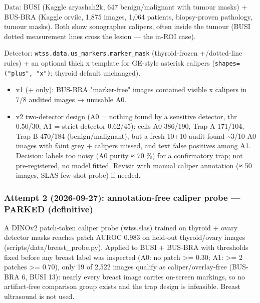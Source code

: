 {\small
Data: BUSI (Kaggle aryashah2k, 647 benign/malignant with tumour masks) + BUS-BRA (Kaggle orvile, 1,875 images,
1,064 patients, biopsy-proven pathology, tumour masks). Both show sonographer calipers, often inside the tumour
(BUSI dotted measurement lines cross the lesion --- the in-ROI case).

Detector: \texttt{wtss.data.us\_markers.marker\_mask} (thyroid-frozen \textquotesingle+\textquotesingle/dotted-line rules) + an optional thick \textquotesingle x\textquotesingle{}
template for GE-style asterisk calipers (\texttt{shapes=("plus",\ "x")}; thyroid default unchanged).

\begin{itemize}

\item
  v1 (\textquotesingle+\textquotesingle{} only): BUS-BRA "marker-free" images contained visible \textquotesingle x\textquotesingle{} calipers in 7/8 audited images → unusable A0.
\item
  v2 two-detector design (A0 = nothing found by a sensitive detector, thr 0.50/30; A1 = strict detector
  0.62/45): cells A0 386/190, Trap A 171/104, Trap B 470/184 (benign/malignant), but a fresh 10+10 audit found
  \textasciitilde3/10 A0 images with faint grey \textquotesingle+\textquotesingle{} calipers missed, and text false positives among A1.
  Decision: labels too noisy (A0 purity ≈ 70 \%) for a confirmatory trap; not pre-registered, no model fitted.
  Revisit with manual caliper annotation (≈ 50 images, SLAS few-shot probe) if needed.
\end{itemize}

\subsubsection{Attempt 2 (2026-09-27): annotation-free caliper probe --- PARKED (definitive)}\label{attempt-2-2026-09-27-annotation-free-caliper-probe--parked-definitive}

A DINOv2 patch-token caliper probe (wtss.slas) trained on thyroid + ovary detector masks reaches patch AUROC 0.983 on
held-out thyroid/ovary images (scripts/data/breast\_probe.py). Applied to BUSI + BUS-BRA with thresholds fixed before
any breast label was inspected (A0: no patch \textgreater= 0.30; A1: \textgreater= 2 patches \textgreater= 0.70), only 19 of 2,522 images qualify as
caliper/overlay-free (BUS-BRA 6, BUSI 13): nearly every breast image carries on-screen markings, so no artifact-free
comparison group exists and the trap design is infeasible. Breast ultrasound is not used.

}

